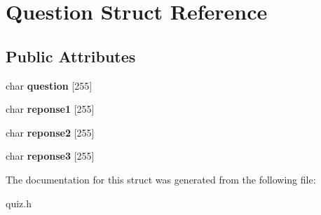 \hypertarget{structQuestion}{}\section{Question Struct Reference}
\label{structQuestion}
\subsection*{Public Attributes}
\begin{DoxyCompactItemize}
\item 
char {\bfseries question} \mbox{[}255\mbox{]}\hypertarget{structQuestion_aa8ca91163674475e19bffaf880bd0d84}{}\label{structQuestion_aa8ca91163674475e19bffaf880bd0d84}

\item 
char {\bfseries reponse1} \mbox{[}255\mbox{]}\hypertarget{structQuestion_aec5adc9c7b2e95f1101615b8a2b7e8e9}{}\label{structQuestion_aec5adc9c7b2e95f1101615b8a2b7e8e9}

\item 
char {\bfseries reponse2} \mbox{[}255\mbox{]}\hypertarget{structQuestion_a4853299f33b67d1c7b56294c827217ff}{}\label{structQuestion_a4853299f33b67d1c7b56294c827217ff}

\item 
char {\bfseries reponse3} \mbox{[}255\mbox{]}\hypertarget{structQuestion_a877f2cedcb1f1c54d630b5974500fb26}{}\label{structQuestion_a877f2cedcb1f1c54d630b5974500fb26}

\end{DoxyCompactItemize}


The documentation for this struct was generated from the following file\+:\begin{DoxyCompactItemize}
\item 
quiz.\+h\end{DoxyCompactItemize}
